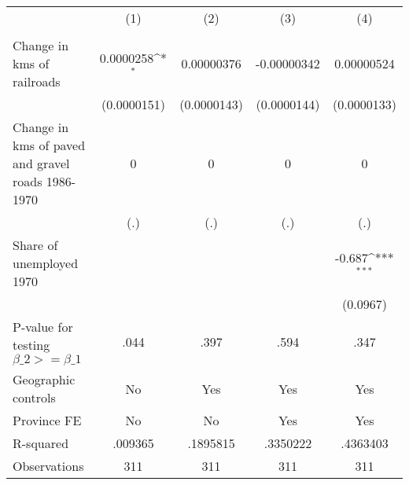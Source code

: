 \begin{table}[htbp]\centering
\def\sym#1{\ifmmode^{#1}\else\(^{#1}\)\fi}
\caption{}
\begin{tabular}{l*{4}{c}}
\hline\hline
                &\multicolumn{1}{c}{(1)}&\multicolumn{1}{c}{(2)}&\multicolumn{1}{c}{(3)}&\multicolumn{1}{c}{(4)}\\
                &\multicolumn{1}{c}{}&\multicolumn{1}{c}{}&\multicolumn{1}{c}{}&\multicolumn{1}{c}{}\\
\hline
Change in kms of railroads&0.0000258\sym{*}  &0.00000376         &-0.00000342         &0.00000524         \\
                &(0.0000151)         &(0.0000143)         &(0.0000144)         &(0.0000133)         \\
[1em]
Change in kms of paved and gravel roads 1986-1970&        0         &        0         &        0         &        0         \\
                &      (.)         &      (.)         &      (.)         &      (.)         \\
[1em]
Share of unemployed 1970&                  &                  &                  &   -0.687\sym{***}\\
                &                  &                  &                  & (0.0967)         \\
\hline
P-value for testing $\beta\_{2} >= \beta\_{1}$&     .044         &     .397         &     .594         &     .347         \\
Geographic controls&       No         &      Yes         &      Yes         &      Yes         \\
Province FE     &       No         &       No         &      Yes         &      Yes         \\
R-squared       &  .009365         & .1895815         & .3350222         & .4363403         \\
Observations    &      311         &      311         &      311         &      311         \\
\hline\hline
\end{tabular}
\end{table}
